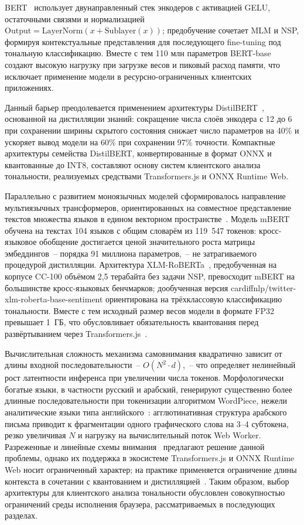 BERT~\cite{devlin2019bert} использует двунаправленный стек энкодеров с активацией GELU, остаточными связями и нормализацией $\mathrm{Output} = \mathrm{LayerNorm}(x + \mathrm{Sublayer}(x))$; предобучение сочетает MLM и NSP, формируя контекстуальные представления для последующего fine-tuning под тональную классификацию. Вместе с тем 110 млн параметров BERT-base создают высокую нагрузку при загрузке весов и пиковый расход памяти, что исключает применение модели в ресурсно-ограниченных клиентских приложениях.

Данный барьер преодолевается применением архитектуры DistilBERT~\cite{sanh2019distilbert}, основанной на дистилляции знаний: сокращение числа слоёв энкодера с 12 до 6 при сохранении ширины скрытого состояния снижает число параметров на 40\% и ускоряет вывод модели на 60\% при сохранении 97\% точности. Компактные архитектуры семейства DistilBERT, конвертированные в формат ONNX и квантованные до INT8, составляют основу систем клиентского анализа тональности, реализуемых средствами Transformers.js и ONNX Runtime Web.

Параллельно с развитием моноязычных моделей сформировалось направление мультиязычных трансформеров, ориентированных на совместное представление текстов множества языков в едином векторном пространстве~\cite{conneau2020unsupervised}. Модель mBERT обучена на текстах 104 языков с общим словарём из 119~547 токенов: кросс-языковое обобщение достигается ценой значительного роста матрицы эмбеддингов~– порядка 91 миллиона параметров,~– не затрагиваемого процедурой дистилляции. Архитектура XLM-RoBERTa~\cite{conneau2020unsupervised}, предобученная на корпусе CC-100 объёмом 2,5 терабайта без задачи NSP, превосходит mBERT на большинстве кросс-языковых бенчмарков; дообученная версия cardiffnlp/twitter-xlm-roberta-base-sentiment ориентирована на трёхклассовую классификацию тональности. Вместе с тем исходный размер весов модели в формате FP32 превышает 1~ГБ, что обусловливает обязательность квантования перед развёртыванием через Transformers.js~\cite{xu2024distillation}.

Вычислительная сложность механизма самовнимания квадратично зависит от длины входной последовательности~– $O(N^2 \cdot d)$,~– что определяет нелинейный рост латентности инференса при увеличении числа токенов. Морфологически богатые языки, в частности русский и арабский, генерируют существенно более длинные последовательности при токенизации алгоритмом WordPiece, нежели аналитические языки типа английского~\cite{rust2021multilingual}: агглютинативная структура арабского письма приводит к фрагментации одного графического слова на 3–4 субтокена, резко увеличивая $N$ и нагрузку на вычислительный поток Web Worker. Разреженные и линейные схемы внимания~\cite{treviso2022efficient} предлагают решение данной проблемы, однако их поддержка в экосистеме Transformers.js и ONNX Runtime Web носит ограниченный характер; на практике применяется ограничение длины контекста в сочетании с квантованием и дистилляцией~\cite{gholami2021quantization}. Таким образом, выбор архитектуры для клиентского анализа тональности обусловлен совокупностью ограничений среды исполнения браузера, рассматриваемых в последующих разделах.

